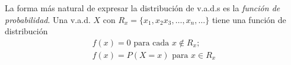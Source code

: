 La forma más natural de expresar la distribución de v.a.d.s es la \emph{función de probabilidad}\cite{blitz19}. Una v.a.d. $X$ con $R_x=\{x_1,x_2x_3,\ldots,x_n,\ldots\}$ tiene una función de distribución
\begin{equation}
\begin{matrix}
f(x)=0\text{ para cada }x \notin R_x\text{;}\\
f(x)=P(X=x)\text{ para } x\in R_x
\end{matrix}\label{eq:FP}
\end{equation}
